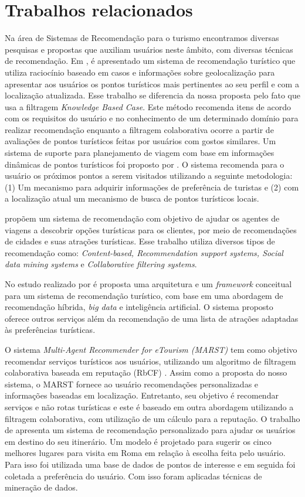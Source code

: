 \documentclass[portuguese]{textolivre}
\begin{document}
\section{Trabalhos relacionados}\label{sec_4}
Na área de Sistemas de Recomendação para o turismo encontramos diversas pesquisas e propostas que auxiliam usuários neste âmbito, com diversas técnicas de recomendação. Em \textcite{da2021sistema}, é apresentado um sistema de recomendação turístico que utiliza raciocínio baseado em casos e informações sobre geolocalização para apresentar aos usuários os pontos turísticos mais pertinentes ao seu perfil e com a localização atualizada. Esse trabalho se diferencia da nossa proposta pelo fato que usa a filtragem \textit{Knowledge Based Case}. Este método recomenda itens de acordo com os requisitos do usuário e no conhecimento de um determinado domínio para realizar recomendação enquanto a filtragem colaborativa ocorre a partir de avaliações de pontos turísticos feitas por usuários com gostos similares. Um sistema de suporte para planejamento de viagem com base em informações dinâmicas de pontos turísticos foi proposto por \textcite{hidaka2020site}. O sistema recomenda para o usuário os próximos pontos a serem visitados utilizando a seguinte metodologia: (1) Um mecanismo para adquirir informações de preferência de turistas e (2) com a localização atual um mecanismo de busca de pontos turísticos locais.

\textcite{loh2003tourism} propõem um sistema de recomendação com objetivo de ajudar os agentes de viagens a descobrir opções turísticas para os clientes, por meio de recomendações de cidades e suas atrações turísticas. Esse trabalho utiliza diversos tipos de recomendação como: \textit{Content-based, Recommendation support systems, Social data mining systems} e \textit{Collaborative filtering systems}.

No estudo realizado por \textcite{al2021hybrid} é proposta uma arquitetura e um \textit{framework} conceitual para um sistema de recomendação turístico, com base em uma abordagem de recomendação híbrida, \textit{big data} e inteligência artificial. O sistema proposto oferece outros serviços além da recomendação de uma lista de atrações adaptadas às preferências turísticas.

O sistema \textit{Multi-Agent Recommender for eTourism (MARST)} tem como objetivo recomendar serviços turísticos aos usuários, utilizando um algoritmo de filtragem colaborativa baseada em reputação (RbCF) \cite{bedi2014marst}. Assim como a proposta do nosso sistema, o MARST fornece ao usuário recomendações personalizadas e informações baseadas em localização. Entretanto, seu objetivo é recomendar serviços e não rotas turísticas e este é baseado em outra abordagem utilizando a filtragem colaborativa, com utilização de um cálculo para a reputação. O trabalho de \textcite{choudhary2019recommender} apresenta um sistema de recomendação personalizado para ajudar os usuários em destino do seu itinerário. Um modelo é projetado para sugerir os cinco melhores lugares para visita em Roma em relação à escolha feita pelo usuário. Para isso foi utilizada uma base de dados de pontos de interesse e em seguida foi coletada a preferência do usuário. Com isso foram aplicadas técnicas de mineração de dados.
\end{document}
